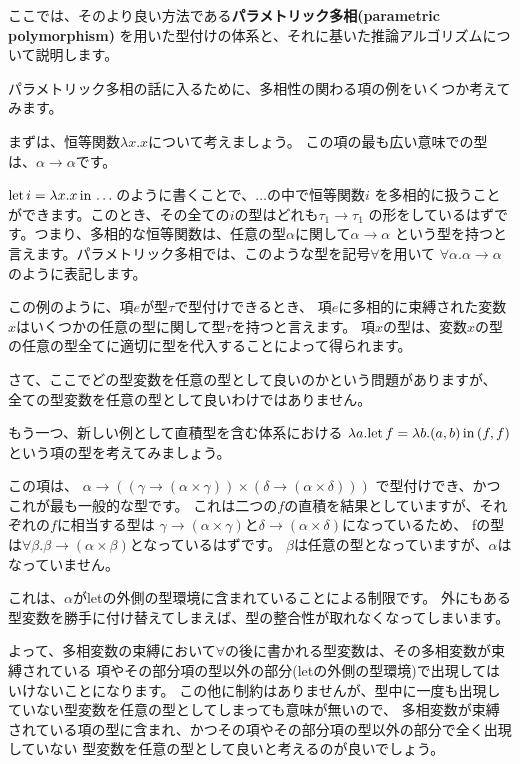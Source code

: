 ここでは、そのより良い方法である\textbf{パラメトリック多相(parametric polymorphism)}
を用いた型付けの体系と、それに基いた推論アルゴリズムについて説明します。

パラメトリック多相の話に入るために、多相性の関わる項の例をいくつか考えてみます。

まずは、恒等関数$\lambda x . x$について考えましょう。
この項の最も広い意味での型は、$\alpha \to \alpha$です。

$\mathrm{let} \, i = \lambda x . x \, \mathrm{in} \, \dots$のように書くことで、$\dots$の中で恒等関数$i$
を多相的に扱うことができます。このとき、その全ての$i$の型はどれも$\tau_1 \to \tau_1$
の形をしているはずです。つまり、多相的な恒等関数は、任意の型$\alpha$に関して$\alpha \to \alpha$
という型を持つと言えます。パラメトリック多相では、このような型を記号$\forall$を用いて
$\forall \alpha . \alpha \to \alpha$のように表記します。

この例のように、項$e$が型$\tau$で型付けできるとき、
項$e$に多相的に束縛された変数$x$はいくつかの任意の型に関して型$\tau$を持つと言えます。
項$x$の型は、変数$x$の型の任意の型全てに適切に型を代入することによって得られます。

さて、ここでどの型変数を任意の型として良いのかという問題がありますが、
全ての型変数を任意の型として良いわけではありません。

もう一つ、新しい例として直積型を含む体系における
$\lambda a . \mathrm{let} \, f = \lambda b . (a, b) \, \mathrm{in} \, (f, f)$という項の型を考えてみましょう。

この項は、
$\alpha \to ((\gamma \to (\alpha \times \gamma)) \times (\delta \to (\alpha \times \delta)))$
で型付けでき、かつこれが最も一般的な型です。
これは二つの$f$の直積を結果としていますが、それぞれの$f$に相当する型は
$\gamma \to (\alpha \times \gamma)$と$\delta \to (\alpha \times \delta)$になっているため、
fの型は$\forall \beta . \beta \to (\alpha \times \beta)$となっているはずです。
$\beta$は任意の型となっていますが、$\alpha$はなっていません。

これは、$\alpha$がletの外側の型環境に含まれていることによる制限です。
外にもある型変数を勝手に付け替えてしまえば、型の整合性が取れなくなってしまいます。

よって、多相変数の束縛において$\forall$の後に書かれる型変数は、その多相変数が束縛されている
項やその部分項の型以外の部分(letの外側の型環境)で出現してはいけないことになります。
この他に制約はありませんが、型中に一度も出現していない型変数を任意の型としてしまっても意味が無いので、
多相変数が束縛されている項の型に含まれ、かつその項やその部分項の型以外の部分で全く出現していない
型変数を任意の型として良いと考えるのが良いでしょう。

